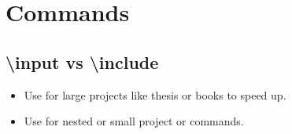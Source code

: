 
\chapter{Commands}
\section{ \textbackslash input vs \textbackslash include  }
\begin{itemize}
	\item Use \lstinline[language=Tex]|| for large projects like thesis or books to speed up.
	\item Use \lstinline[language=Tex]|| for nested or small project or commands.
\end{itemize}
